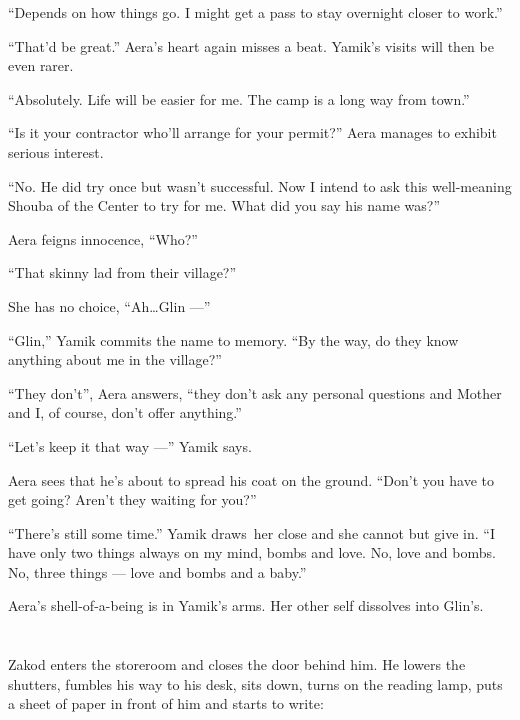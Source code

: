\documentclass[twoside,11pt]{book}
\begin{document}
{}``Depends on how things go. I might get a pass to stay overnight closer to work.''

{}``That'd be great.'' Aera's heart again misses a beat. Yamik's visits will then be even rarer.

{}``Absolutely. Life will be easier for me. The camp is a long way from town.''

{}``Is it your contractor who'll arrange for your permit?'' Aera manages to exhibit serious interest.

{}``No. He did try once but wasn't successful. Now I intend to ask this well-meaning Shouba of the Center to try for me.
What did you say his name was?''

Aera feigns innocence, ``Who?''

{}``That skinny lad from their village?''

She has no choice, ``Ah{\ldots}Glin ---''

{}``Glin,{}'' Yamik commits the name to memory. ``By the way, do they know anything about me in the
village?''

``They don't'', Aera answers, ``they don't ask any personal questions and Mother
and I, of course, don't offer anything.''

``Let's keep it that way ---'' Yamik says.

Aera sees that he's about to spread his coat on the ground. ``Don't you have to get going? Aren't they waiting for
you?''

{}``There's still some time.'' Yamik draws~her close and she cannot but give in. ``I have only two things always on my
mind, bombs and love. No, love and bombs. No, three things --- love and bombs and a baby.''

Aera's shell-of-a-being is in Yamik's arms.{ }Her other self dissolves into Glin's.



\chapter{}

Zakod enters the storeroom and closes the door behind him. He lowers the shutters, fumbles his way to his desk, sits
down, turns on the reading lamp, puts a sheet of paper in front of him and starts to write:
\end{document}
